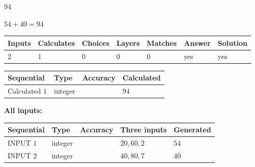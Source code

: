 \documentclass[12pt]{article}
\begin{document}
 

94
 
 
\noindent{}
 
 

 
 
 
\noindent{}
 
 

$ %
54 +  %
40=   %
94$
 
 
\noindent{}
 
 

 
   
   
   
   
\noindent\begin{tabular}{|l|l|l|l|l|l|l|}
 \hline
Inputs & Calculates & Choices & Layers & Matches & Answer & Solution \\ \hline
 2  & 
 1  & 
 0
  & 
 0  & 
 0  & 
  yes & 
  yes 
  \\ \hline
 \end{tabular}
   
   
   
   
\noindent{}
   
   
  
  
\noindent\begin{tabular}{|l|l|l|l|}
\hline
 Sequential & Type & Accuracy & Calculated \\ 
\hline
 
 
  Calculated $  1 $ & integer &  & 
  $ 94 $ 
 \\  \hline  
 \end{tabular}
   
   
   
   
\noindent\vspace{0.1in}\hspace{-0.08in} {\textbf{\Large{All inputs: }}}
   
   
  
  
\noindent\begin{tabular}{|l|l|l|l|l|}
\hline
 Sequential & Type & Accuracy & Three inputs & Generated \\ 
\hline
 
 
  INPUT $  1 $ & integer &  & $
 20
 , 
 60
 , 
 2
 $ & $ 54 $ 
 \\  \hline  
 
 
  INPUT $  2 $ & integer &  & $
 40
 , 
 80
 , 
 7
 $ & $ 40 $ 
 \\  \hline  
 \end{tabular}
   
\end{document}
